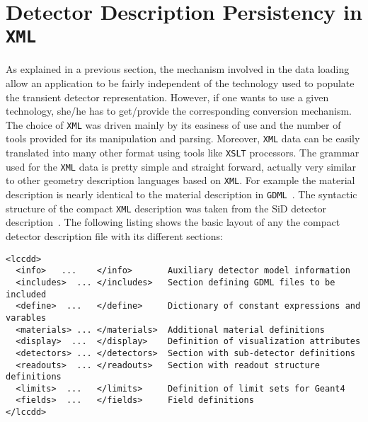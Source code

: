 \section{Detector Description Persistency in \texttt{XML}}
\label{sec:compact-xml-structure}
As explained in a previous section, the mechanism involved in the data loading  allow an application to be fairly independent of the technology used to populate the transient detector representation. However, if one wants to use a given technology, she/he has to get/provide the corresponding conversion mechanism. The choice of \texttt{XML} was driven mainly by its easiness of use and the number of tools provided for its manipulation and parsing. Moreover, \texttt{XML} data can be easily translated into many other format using tools like \texttt{XSLT}  processors. The grammar used for the \texttt{XML} data is pretty simple and straight forward, actually very similar to other geometry description languages based on \texttt{XML}. For example the material description is nearly identical to the material description in \texttt{GDML}~\cite{Chytracek:2006be}. The syntactic structure of the compact \texttt{XML} description was taken from the SiD detector description~\cite{Gaede:81331}. The following listing shows the basic layout of any the compact detector description file with its different sections:

\begin{verbatim}
<lccdd>
  <info>   ...    </info>       Auxiliary detector model information
  <includes>  ... </includes>   Section defining GDML files to be included
  <define>  ...   </define>     Dictionary of constant expressions and varables
  <materials> ... </materials>  Additional material definitions
  <display>  ...  </display>    Definition of visualization attributes
  <detectors> ... </detectors>  Section with sub-detector definitions
  <readouts>  ... </readouts>   Section with readout structure definitions
  <limits>  ...   </limits>     Definition of limit sets for Geant4
  <fields>  ...   </fields>     Field definitions
</lccdd>
\end{verbatim}

